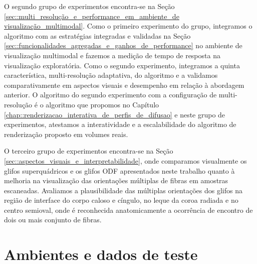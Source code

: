 O segundo grupo de experimentos encontra-se na Seção \ref{sec::multi_resolução_e_performance_em_ambiente_de visualização_multimodal}. Como o primeiro experimento do grupo, integramos o algoritmo com as estratégias integradas e validadas na Seção \ref{sec::funcionalidades_agregadas_e_ganhos_de_performance} no ambiente de visualização multimodal e fazemos a medição de tempo de resposta na visualização exploratória. Como o segundo experimento, integramos a quinta característica, multi-resolução adaptativa, do algoritmo e a validamos comparativamente em aspectos visuais e desempenho em relação à abordagem anterior. O algoritmo do segundo experimento com a configuração de multi-resolução é o algoritmo que propomos no Capítulo \ref{chap::renderizacao_interativa_de_perfis_de_difusao} e neste grupo de experimentos, atestamos a interatividade e a escalabilidade do algoritmo de renderização proposto em volumes reais.


O terceiro grupo de experimentos encontra-se na Seção \ref{sec::aspectos_visuais_e_interpretabilidade}, onde  comparamos visualmente os glifos superquádricos e os glifos ODF apresentados neste trabalho quanto à melhoria na visualização das orientações múltiplas de fibras em amostras escaneadas. Avaliamos a plausibilidade das múltiplas orientações dos glifos na região de interface do corpo caloso e cíngulo, no leque da coroa radiada e no centro semioval, onde é reconhecida anatomicamente a ocorrência de encontro de dois ou mais conjunto de fibras.
 

\section{Ambientes e dados de teste}
\label{sec::ambientes_e_dados_de_dados}

